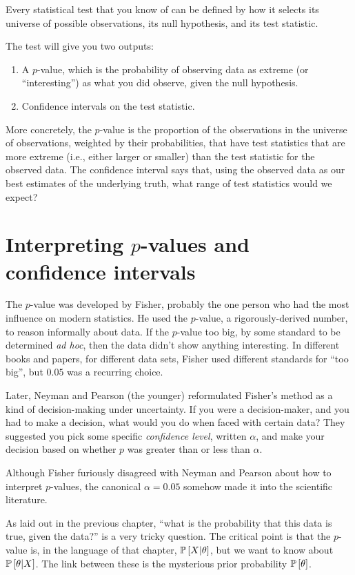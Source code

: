 Every statistical test that you know of can be defined by how it selects its
universe of possible observations, its null hypothesis, and its test statistic.

The test will give you two outputs:

\begin{enumerate}
\item A $p$-value, which is the probability of observing data as extreme (or ``interesting'') as what you did observe, given the null hypothesis.
\item Confidence intervals on the test statistic.
\end{enumerate}

More concretely, the $p$-value is the proportion of the observations in the universe of observations, weighted by their probabilities, that have test statistics that are more extreme (i.e., either larger or smaller) than the test statistic for the observed data. The confidence interval says that, using the observed data as our best estimates of the underlying truth, what range of test statistics would we expect?

\section{Interpreting $p$-values and confidence intervals}

The $p$-value was developed by Fisher, probably the one person who had the most influence on modern statistics. He used the $p$-value, a rigorously-derived number, to reason informally about data. If the $p$-value too big, by some standard to be determined \textit{ad hoc}, then the data didn't show anything interesting. In different books and papers, for different data sets, Fisher used different standards for ``too big'', but $0.05$ was a recurring choice.

Later, Neyman and Pearson (the younger) reformulated Fisher's method as a kind
of decision-making under uncertainty. If you were a decision-maker, and you had
to make a decision, what would you do when faced with certain data? They
suggested you pick some specific \emph{confidence level}, written $\alpha$, and
make your decision based on whether $p$ was greater than or less than $\alpha$.

Although Fisher furiously disagreed with Neyman and Pearson about how to interpret $p$-values, the canonical $\alpha = 0.05$ somehow made it into the scientific literature.

As laid out in the previous chapter, ``what is the probability that this data is true, given the data?'' is a very tricky question. The critical point is that the $p$-value is, in the language of that chapter, $\mathbb{P}\left[{X | \theta}\right]$, but we want to know about $\mathbb{P}\left[{\theta | X}\right]$. The link between these is the mysterious prior probability $\mathbb{P}\left[{\theta}\right]$.

